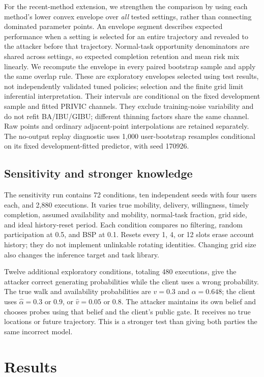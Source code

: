 \documentclass[3p,times]{elsarticle}
\begin{document}
For the recent-method extension, we strengthen the comparison by using each method's lower convex envelope over \emph{all} tested settings, rather than connecting dominated parameter points. An envelope segment describes expected performance when a setting is selected for an entire trajectory and revealed to the attacker before that trajectory. Normal-task opportunity denominators are shared across settings, so expected completion retention and mean risk mix linearly. We recompute the envelope in every paired bootstrap sample and apply the same overlap rule. These are exploratory envelopes selected using test results, not independently validated tuned policies; selection and the finite grid limit inferential interpretation. Their intervals are conditional on the fixed development sample and fitted PRIVIC channels. They exclude training-noise variability and do not refit BA/IBU/GIBU; different thinning factors share the same channel. Raw points and ordinary adjacent-point interpolations are retained separately. The no-output replay diagnostic uses 1,000 user-bootstrap resamples conditional on its fixed development-fitted predictor, with seed 170926.

\subsection{Sensitivity and stronger knowledge}
The sensitivity run contains 72 conditions, ten independent seeds with four users each, and 2,880 executions. It varies true mobility, delivery, willingness, timely completion, assumed availability and mobility, normal-task fraction, grid side, and ideal history-reset period. Each condition compares no filtering, random participation at 0.5, and BSP at 0.1. Resets every 1, 4, or 12 slots erase account history; they do not implement unlinkable rotating identities. Changing grid size also changes the inference target and task library.

Twelve additional exploratory conditions, totaling 480 executions, give the attacker correct generating probabilities while the client uses a wrong probability. The true walk and availability probabilities are $v=0.3$ and $\alpha=0.648$; the client uses $\widehat\alpha=0.3$ or $0.9$, or $\widehat v=0.05$ or $0.8$. The attacker maintains its own belief and chooses probes using that belief and the client's public gate. It receives no true locations or future trajectory. This is a stronger test than giving both parties the same incorrect model.

\section{Results}
\label{sec:results}
\end{document}
